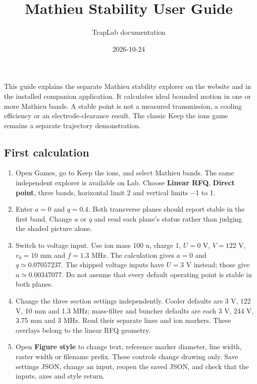 \documentclass[
  aps,
  onecolumn,
  11pt]{revtex4-2}
\title{Mathieu Stability User Guide}
\author{TrapLab documentation}
\date{2026-10-24}
\providecommand{\tightlist}{%
  \setlength{\itemsep}{0pt}\setlength{\parskip}{0pt}}
\begin{document}
\maketitle

This guide explains the separate Mathieu stability explorer on the
website and in the installed companion application. It calculates ideal
bounded motion in one or more Mathieu bands. A stable point is not a
measured transmission, a cooling efficiency or an electrode-clearance
result. The classic Keep the ions game remains a separate trajectory
demonstration.

\subsection{First calculation}\label{first-calculation}

\begin{enumerate}
\def\labelenumi{\arabic{enumi}.}
\tightlist
\item
  Open Games, go to Keep the ions, and select Mathieu bands. The same
  independent explorer is available on Lab. Choose \textbf{Linear RFQ},
  \textbf{Direct point}, three bands, horizontal limit 2 and vertical
  limits −1 to 1.
\item
  Enter \(a=0\) and \(q=0.4\). Both transverse planes should report
  stable in the first band. Change \(a\) or \(q\) and read each plane's
  status rather than judging the shaded picture alone.
\item
  Switch to voltage input. Use ion mass 100 u, charge 1, \(U=0\) V,
  \(V=122\) V, \(r_0=10\) mm and \(f=1.3\) MHz. The calculation gives
  \(a=0\) and \(q\simeq0.07057237\). The shipped voltage inputs have
  \(U=3\) V instead; those give \(a\simeq0.00347077\). Do not assume
  that every default operating point is stable in both planes.
\item
  Change the three section settings independently. Cooler defaults are 3
  V, 122 V, 10 mm and 1.3 MHz; mass-filter and buncher defaults are each
  3 V, 244 V, 3.75 mm and 3 MHz. Read their separate lines and ion
  markers. These overlays belong to the linear RFQ geometry.
\item
  Open \textbf{Figure style} to change text, reference marker diameter,
  line width, raster width or filename prefix. These controls change
  drawing only. Save settings JSON, change an input, reopen the saved
  JSON, and check that the inputs, axes and style return.
\end{enumerate}
\end{document}
